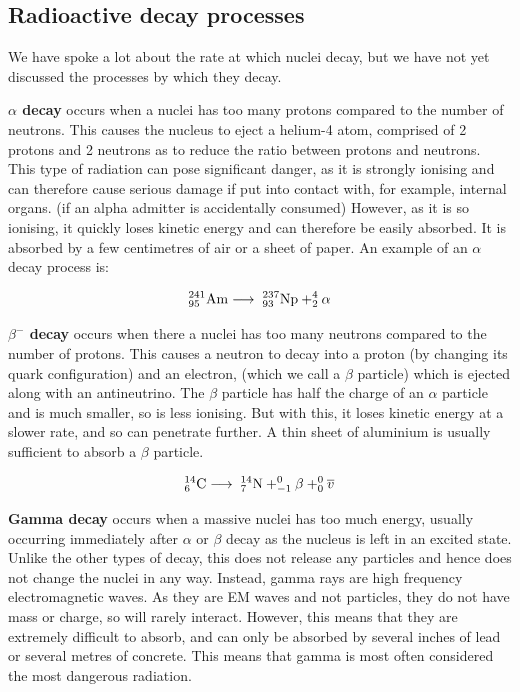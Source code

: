 \subsection{Radioactive decay processes}
We have spoke a lot about the rate at which nuclei decay, but we have not yet discussed the processes by which they decay. 

\textbf{\(\alpha\) decay} occurs when a nuclei has too many protons compared to the number of neutrons. This causes the nucleus to eject a helium-4 atom, comprised of 2 protons and 2 neutrons as to reduce the ratio between protons and neutrons. This type of radiation can pose significant danger, as it is strongly ionising and can therefore cause serious damage if put into contact with, for example, internal organs. (if an alpha admitter is accidentally consumed) However, as it is so ionising, it quickly loses kinetic energy and can therefore be easily absorbed. It is absorbed by a few centimetres of air or a sheet of paper. An example of an \(\alpha\) decay process is: 

\begin{equation*} 
_{95}^{241} \textrm{Am} \longrightarrow \hspace{1mm} _{93}^{237} \textrm{Np} + _2^4 \alpha
\end{equation*} 

\textbf{\(\beta^-\) decay} occurs when there a nuclei has too many neutrons compared to the number of protons. This causes a neutron to decay into a proton (by changing its quark configuration) and an electron, (which we call a \(\beta\) particle) which is ejected along with an antineutrino. The \(\beta\) particle has half the charge of an \(\alpha\) particle and is much smaller, so is less ionising. But with this, it loses kinetic energy at a slower rate, and so can penetrate further. A thin sheet of aluminium is usually sufficient to absorb a \(\beta\) particle. 

\begin{equation*} 
_{6}^{14} \textrm{C} \longrightarrow \hspace{1mm} _{7}^{14} \textrm{N} + _{-1}^{0} \beta + _{0}^{0} \overline{v}
\end{equation*} 

\textbf{Gamma decay} occurs when a massive nuclei has too much energy, usually occurring immediately after \(\alpha\) or \(\beta\) decay as the nucleus is left in an excited state. Unlike the other types of decay, this does not release any particles and hence does not change the nuclei in any way. Instead, gamma rays are high frequency electromagnetic waves. As they are EM waves and not particles, they do not have mass or charge, so will rarely interact. However, this means that they are extremely difficult to absorb, and can only be absorbed by several inches of lead or several metres of concrete. This means that gamma is most often considered the most dangerous radiation.  

